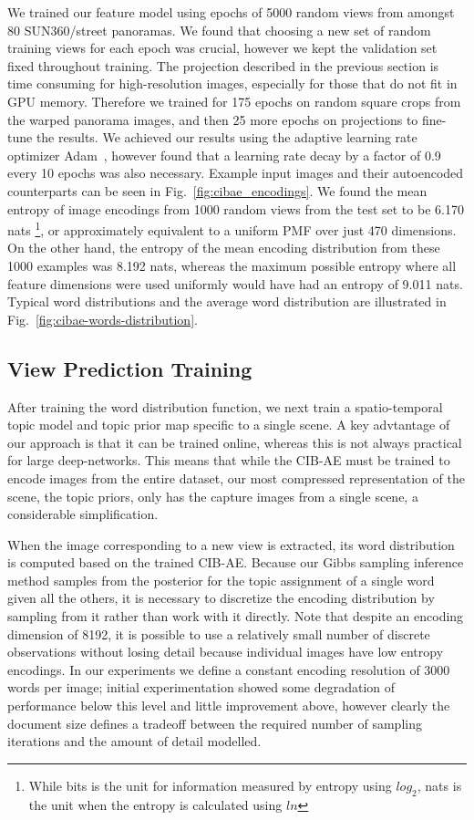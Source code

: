 We trained our feature model using epochs of 5000 random views from amongst 80 SUN360/street panoramas. We found that choosing a new set of random training views for each epoch was crucial, however we kept the validation set fixed throughout training. The projection described in the previous section is time consuming for high-resolution images, especially for those that do not fit in GPU memory. Therefore we trained for 175 epochs on random square crops from the warped panorama images, and then 25 more epochs on projections to fine-tune the results. We achieved our results using the adaptive learning rate optimizer Adam~\citep{KingmaAdam}, however found that a learning rate decay by a factor of 0.9 every 10 epochs was also necessary. Example input images and their autoencoded counterparts can be seen in Fig.~\ref{fig:cibae_encodings}. We found the mean entropy of image encodings from 1000 random views from the test set to be 6.170 nats \footnote{While bits is the unit for information measured by entropy using $log_2$, nats is the unit when the entropy is calculated using $ln$}, or approximately equivalent to a uniform PMF over just 470 dimensions. On the other hand, the entropy of the mean encoding distribution from these 1000 examples was 8.192 nats, whereas the maximum possible entropy where all feature dimensions were used uniformly would have had an entropy of 9.011 nats. Typical word distributions and the average word distribution are illustrated in Fig.~\ref{fig:cibae-words-distribution}.

\subsection{View Prediction Training}
After training the word distribution function, we next train a spatio-temporal topic model and topic prior map specific to a single scene. A key advtantage of our approach is that it can be trained online, whereas this is not always practical for large deep-networks. This means that while the CIB-AE must be trained to encode images from the entire dataset, our most compressed representation of the scene, the topic priors, only has the capture images from a single scene, a considerable simplification.

When the image corresponding to a new view is extracted, its word distribution is computed based on the trained CIB-AE. Because our Gibbs sampling inference method samples from the posterior for the topic assignment of a single word given all the others, it is necessary to discretize the encoding distribution by sampling from it rather than work with it directly. Note that despite an encoding dimension of 8192, it is possible to use a relatively small number of discrete observations without losing detail because individual images have low entropy encodings. In our experiments we define a constant encoding resolution of 3000 words per image; initial experimentation showed some degradation of performance below this level and little improvement above, however clearly the document size defines a tradeoff between the required number of sampling iterations and the amount of detail modelled.

